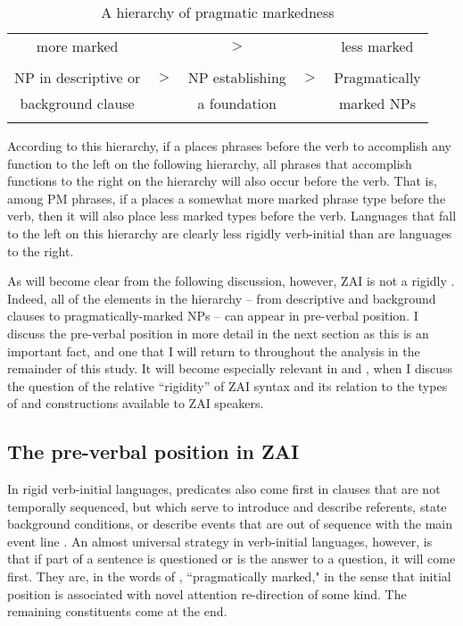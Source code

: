 \begin{table}

\begin{tabular}{ c c c c c }
\midrule
more marked & & $>$ & & less marked \\
 & & &  & \\
NP in descriptive or &  $>$ & NP establishing & $>$ & Pragmatically  \\
background clause &  & a foundation &  &  marked NPs \\

\lspbottomrule
\end{tabular}\caption{{A hierarchy of pragmatic markedness \citep[479]{payne1995}}}
\label{pragmaticmarkednesstable}

\end{table} 
According to this hierarchy, if a  places phrases before the verb to accomplish any function to the left on the following hierarchy, all phrases that accomplish functions to the right on the hierarchy will also occur before the verb. That is, among PM phrases, if a  places a somewhat more marked phrase type before the verb, then it will also place less marked types before the verb. Languages that fall to the left on this hierarchy are clearly less rigidly verb-initial than are languages to the right.

As will become clear from the following discussion, however, ZAI is not a rigidly . Indeed, all of the elements in the hierarchy -- from descriptive and background clauses to pragmatically-marked NPs -- can appear in pre-verbal position. I discuss the pre-verbal position in more detail in the next section as this is an important fact, and one that I will return to throughout the analysis in the remainder of this study. It will become especially relevant in  and , when I discuss the question of the relative ``rigidity'' of ZAI syntax and its relation to the types of  and  constructions available to ZAI speakers. 


\subsection{The pre-verbal position in ZAI}\label{pre-verbalpos}

In rigid verb-initial languages, predicates also come first in clauses that are not temporally sequenced, but which serve to introduce and describe referents, state background conditions, or describe events that are out of sequence with the main event line \citep[454]{payne1995}. An almost universal strategy in verb-initial languages, however, is that if part of a sentence is questioned or is the answer to a question, it will come first. They are, in the words of \citet{payne1995}, ``pragmatically marked," in the sense that initial position is associated with novel attention re-direction of some kind. The remaining constituents come at the end. 

